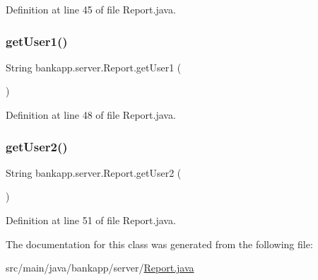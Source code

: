 Definition at line 45 of file Report.\+java.

\mbox{\label{classbankapp_1_1server_1_1_report_a729278e864ae92cf24acceb146ad6e13}} 
\subsubsection{\texorpdfstring{get\+User1()}{getUser1()}}
{\footnotesize\ttfamily String bankapp.\+server.\+Report.\+get\+User1 (\begin{DoxyParamCaption}{ }\end{DoxyParamCaption})}



Definition at line 48 of file Report.\+java.

\mbox{\label{classbankapp_1_1server_1_1_report_a10fd25b1cddd994b465740e3dab0870b}} 
\subsubsection{\texorpdfstring{get\+User2()}{getUser2()}}
{\footnotesize\ttfamily String bankapp.\+server.\+Report.\+get\+User2 (\begin{DoxyParamCaption}{ }\end{DoxyParamCaption})}



Definition at line 51 of file Report.\+java.



The documentation for this class was generated from the following file\+:\begin{DoxyCompactItemize}
\item 
src/main/java/bankapp/server/\hyperlink{_report_8java}{Report.\+java}\end{DoxyCompactItemize}
